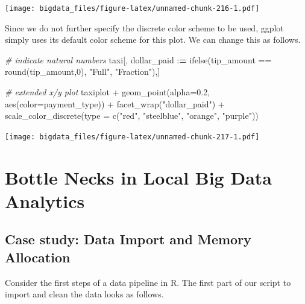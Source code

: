 \documentclass[
  12pt,
]{style/krantz}
\newenvironment{Shaded}{\begin{snugshade}}{\end{snugshade}}
\newcommand{\AttributeTok}[1]{\textcolor[rgb]{0.77,0.63,0.00}{#1}}
\newcommand{\CommentTok}[1]{\textcolor[rgb]{0.56,0.35,0.01}{\textit{#1}}}
\newcommand{\DecValTok}[1]{\textcolor[rgb]{0.00,0.00,0.81}{#1}}
\newcommand{\ErrorTok}[1]{\textcolor[rgb]{0.64,0.00,0.00}{\textbf{#1}}}
\newcommand{\FloatTok}[1]{\textcolor[rgb]{0.00,0.00,0.81}{#1}}
\newcommand{\FunctionTok}[1]{\textcolor[rgb]{0.00,0.00,0.00}{#1}}
\newcommand{\NormalTok}[1]{#1}
\newcommand{\SpecialCharTok}[1]{\textcolor[rgb]{0.00,0.00,0.00}{#1}}
\newcommand{\StringTok}[1]{\textcolor[rgb]{0.31,0.60,0.02}{#1}}
\begin{document}
\texttt{[image: bigdata\_files/figure-latex/unnamed-chunk-216-1.pdf]}

Since we do not further specify the discrete color scheme to be used, ggplot simply uses its default color scheme for this plot. We can change this as follows.

\begin{Shaded}
\begin{Highlighting}[]
\CommentTok{\# indicate natural numbers}
\NormalTok{taxi[, dollar\_paid }\SpecialCharTok{:}\ErrorTok{=} \FunctionTok{ifelse}\NormalTok{(tip\_amount }\SpecialCharTok{==} \FunctionTok{round}\NormalTok{(tip\_amount,}\DecValTok{0}\NormalTok{), }\StringTok{"Full"}\NormalTok{, }\StringTok{"Fraction"}\NormalTok{),]}


\CommentTok{\# extended x/y plot}
\NormalTok{taxiplot }\SpecialCharTok{+}
     \FunctionTok{geom\_point}\NormalTok{(}\AttributeTok{alpha=}\FloatTok{0.2}\NormalTok{, }\FunctionTok{aes}\NormalTok{(}\AttributeTok{color=}\NormalTok{payment\_type)) }\SpecialCharTok{+}
     \FunctionTok{facet\_wrap}\NormalTok{(}\StringTok{"dollar\_paid"}\NormalTok{) }\SpecialCharTok{+}
     \FunctionTok{scale\_color\_discrete}\NormalTok{(}\AttributeTok{type =} \FunctionTok{c}\NormalTok{(}\StringTok{"red"}\NormalTok{, }\StringTok{"steelblue"}\NormalTok{, }\StringTok{"orange"}\NormalTok{, }\StringTok{"purple"}\NormalTok{))}
\end{Highlighting}
\end{Shaded}

\texttt{[image: bigdata\_files/figure-latex/unnamed-chunk-217-1.pdf]}

\hypertarget{bottle-necks-in-local-big-data-analytics}{%
\chapter{Bottle Necks in Local Big Data Analytics}\label{bottle-necks-in-local-big-data-analytics}}

\hypertarget{case-study-data-import-and-memory-allocation}{%
\section{Case study: Data Import and Memory Allocation}\label{case-study-data-import-and-memory-allocation}}

Consider the first steps of a data pipeline in R. The first part of our script to import and clean the data looks as follows.
\end{document}

